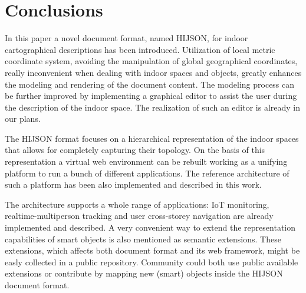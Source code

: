 \section{Conclusions}\label{conclusions}

In this paper a novel document format, named HIJSON, for indoor cartographical descriptions has been
introduced. Utilization of local metric coordinate system,
avoiding the manipulation of global geographical coordinates, really inconvenient when
dealing with indoor spaces and objects, greatly enhances the modeling and rendering
of the document content. The modeling process can be further improved by implementing a
graphical editor to assist the user during the description of the indoor
space. The realization of such an editor is already in our plans.

The HIJSON format focuses on a hierarchical representation of the indoor
spaces that allows for completely capturing their topology. On the basis of
this representation a virtual web environment can be rebuilt working as a
unifying platform to run a bunch of different applications. The reference
architecture of such a platform has been also implemented and described in
this work. 

The architecture supports a whole range of applications: IoT monitoring,
realtime-multiperson tracking and user cross-storey navigation are already
implemented and described. A very convenient way to extend the representation
capabilities of smart objects is also mentioned as semantic extensions. These
extensions, which affects both document format and its web framework, might be
easly collected in a public repository. Community could both use public
available extensions or contribute by mapping new (smart) objects inside the
HIJSON document format.
